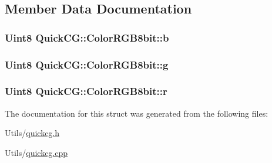 \subsection{Member Data Documentation}
\hypertarget{structQuickCG_1_1ColorRGB8bit_a6f74056a1bc52437a5e9c4c0af4177b7}{
\subsubsection[{b}]{\setlength{\rightskip}{0pt plus 5cm}Uint8 Quick\-C\-G\-::\-Color\-R\-G\-B8bit\-::b}}\label{structQuickCG_1_1ColorRGB8bit_a6f74056a1bc52437a5e9c4c0af4177b7}
\hypertarget{structQuickCG_1_1ColorRGB8bit_a04249198bd045324503af50b82ddf923}{
\subsubsection[{g}]{\setlength{\rightskip}{0pt plus 5cm}Uint8 Quick\-C\-G\-::\-Color\-R\-G\-B8bit\-::g}}\label{structQuickCG_1_1ColorRGB8bit_a04249198bd045324503af50b82ddf923}
\hypertarget{structQuickCG_1_1ColorRGB8bit_adbcc046ebfa38ac05446b51f341363f9}{
\subsubsection[{r}]{\setlength{\rightskip}{0pt plus 5cm}Uint8 Quick\-C\-G\-::\-Color\-R\-G\-B8bit\-::r}}\label{structQuickCG_1_1ColorRGB8bit_adbcc046ebfa38ac05446b51f341363f9}


The documentation for this struct was generated from the following files\-:\begin{DoxyCompactItemize}
\item 
Utils/\hyperlink{quickcg_8h}{quickcg.\-h}\item 
Utils/\hyperlink{quickcg_8cpp}{quickcg.\-cpp}\end{DoxyCompactItemize}
